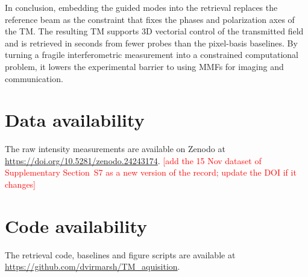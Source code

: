 \documentclass{article}
\begin{document}
In conclusion, embedding the guided modes into the retrieval replaces the reference beam as the constraint that fixes the phases and polarization axes of the TM. The resulting TM supports 3D vectorial control of the transmitted field and is retrieved in seconds from fewer probes than the pixel-basis baselines. By turning a fragile interferometric measurement into a constrained computational problem, it lowers the experimental barrier to using MMFs for imaging and communication.


\section*{Data availability}
The raw intensity measurements are available on Zenodo at \url{https://doi.org/10.5281/zenodo.24243174}. \textcolor{red}{[add the 15 Nov dataset of Supplementary Section~S7 as a new version of the record; update the DOI if it changes]}

\section*{Code availability}
The retrieval code, baselines and figure scripts are available at \url{https://github.com/dvirmarsh/TM_aquisition}.


\end{document}

